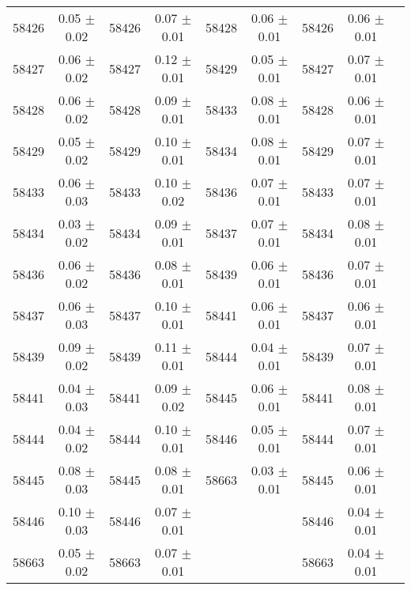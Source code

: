 \begin{center}
\begin{longtable}{ccccccccc}
58426 & 0.05 $\pm$ 0.02 & 58426 & 0.07 $\pm$ 0.01 & 58428 & 0.06 $\pm$ 0.01 & 58426 & 0.06 $\pm$ 0.01 & \\
58427 & 0.06 $\pm$ 0.02 & 58427 & 0.12 $\pm$ 0.01 & 58429 & 0.05 $\pm$ 0.01 & 58427 & 0.07 $\pm$ 0.01 & \\
58428 & 0.06 $\pm$ 0.02 & 58428 & 0.09 $\pm$ 0.01 & 58433 & 0.08 $\pm$ 0.01 & 58428 & 0.06 $\pm$ 0.01 & \\
58429 & 0.05 $\pm$ 0.02 & 58429 & 0.10 $\pm$ 0.01 & 58434 & 0.08 $\pm$ 0.01 & 58429 & 0.07 $\pm$ 0.01 & \\
58433 & 0.06 $\pm$ 0.03 & 58433 & 0.10 $\pm$ 0.02 & 58436 & 0.07 $\pm$ 0.01 & 58433 & 0.07 $\pm$ 0.01 & \\
58434 & 0.03 $\pm$ 0.02 & 58434 & 0.09 $\pm$ 0.01 & 58437 & 0.07 $\pm$ 0.01 & 58434 & 0.08 $\pm$ 0.01 & \\
58436 & 0.06 $\pm$ 0.02 & 58436 & 0.08 $\pm$ 0.01 & 58439 & 0.06 $\pm$ 0.01 & 58436 & 0.07 $\pm$ 0.01 & \\
58437 & 0.06 $\pm$ 0.03 & 58437 & 0.10 $\pm$ 0.01 & 58441 & 0.06 $\pm$ 0.01 & 58437 & 0.06 $\pm$ 0.01 & \\
58439 & 0.09 $\pm$ 0.02 & 58439 & 0.11 $\pm$ 0.01 & 58444 & 0.04 $\pm$ 0.01 & 58439 & 0.07 $\pm$ 0.01 & \\
58441 & 0.04 $\pm$ 0.03 & 58441 & 0.09 $\pm$ 0.02 & 58445 & 0.06 $\pm$ 0.01 & 58441 & 0.08 $\pm$ 0.01 & \\
58444 & 0.04 $\pm$ 0.02 & 58444 & 0.10 $\pm$ 0.01 & 58446 & 0.05 $\pm$ 0.01 & 58444 & 0.07 $\pm$ 0.01 & \\
58445 & 0.08 $\pm$ 0.03 & 58445 & 0.08 $\pm$ 0.01 & 58663 & 0.03 $\pm$ 0.01 & 58445 & 0.06 $\pm$ 0.01 & \\
58446 & 0.10 $\pm$ 0.03 & 58446 & 0.07 $\pm$ 0.01 & & & 58446 & 0.04 $\pm$ 0.01 & \\
58663 & 0.05 $\pm$ 0.02 & 58663 & 0.07 $\pm$ 0.01 & & & 58663 & 0.04 $\pm$ 0.01 & \\

\hline
\end{longtable}
\end{center}